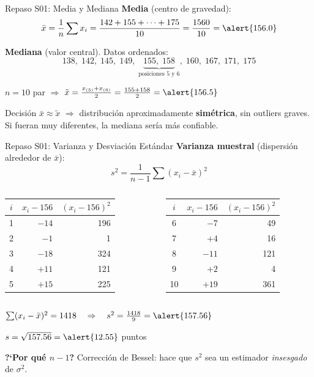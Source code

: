 \documentclass[aspectratio=169, 11pt]{beamer}
\begin{document}
\begin{frame}{Repaso S01: Media y Mediana}
\textbf{Media} (centro de gravedad):
\[
\bar{x} = \frac{1}{n}\sum x_i = \frac{142 + 155 + \cdots + 175}{10} = \frac{1560}{10} = \alert{156.0}
\]

\textbf{Mediana} (valor central). Datos ordenados:
\[
138,\; 142,\; 145,\; 149,\; \underbrace{155,\; 158}_{\text{posiciones 5 y 6}},\; 160,\; 167,\; 171,\; 175
\]

$n = 10$ par $\Rightarrow$ $\tilde{x} = \frac{x_{(5)} + x_{(6)}}{2} = \frac{155 + 158}{2} = \alert{156.5}$

\vspace{0.3cm}
\begin{alertblock}{Decisi\'on}
$\bar{x} \approx \tilde{x}$ $\Rightarrow$ distribuci\'on aproximadamente \textbf{sim\'etrica}, sin outliers graves. Si fueran muy diferentes, la mediana ser\'ia m\'as confiable.
\end{alertblock}
\end{frame}

\begin{frame}{Repaso S01: Varianza y Desviaci\'on Est\'andar}
\textbf{Varianza muestral} (dispersi\'on alrededor de $\bar{x}$):
\[
s^2 = \frac{1}{n-1}\sum(x_i - \bar{x})^2
\]

\vspace{-0.3cm}
\begin{columns}[T]
\small
\begin{tabular}{crr}
\toprule
$i$ & $x_i - 156$ & $(x_i - 156)^2$ \\
\midrule
1 & $-14$ & 196 \\
2 & $-1$  & 1 \\
3 & $-18$ & 324 \\
4 & $+11$ & 121 \\
5 & $+15$ & 225 \\
\bottomrule
\end{tabular}

\small
\begin{tabular}{crr}
\toprule
$i$ & $x_i - 156$ & $(x_i - 156)^2$ \\
\midrule
6 & $-7$  & 49 \\
7 & $+4$  & 16 \\
8 & $-11$ & 121 \\
9 & $+2$  & 4 \\
10 & $+19$ & 361 \\
\bottomrule
\end{tabular}
\end{columns}

\vspace{0.3cm}
$\sum(x_i - \bar{x})^2 = 1418 \quad\Rightarrow\quad s^2 = \frac{1418}{9} = \alert{157.56}$

$s = \sqrt{157.56} = \alert{12.55}$ puntos

\vspace{0.2cm}
\small\textbf{?`Por qu\'e $n-1$?} Correcci\'on de Bessel: hace que $s^2$ sea un estimador \emph{insesgado} de $\sigma^2$.
\end{frame}
\end{document}
